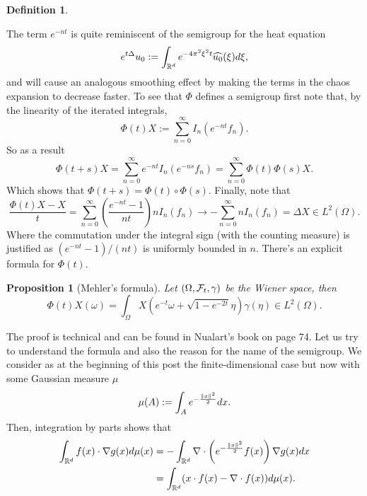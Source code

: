 \documentclass[12pt]{article}
\newtheorem{proposition}{Proposition}
\newtheorem{definition}{Definition}
\begin{document}
\begin{CJK*}{UTF8}{gbsn}
\begin{definition}
	\end{definition}
	The term $e^{-nt}$ is quite reminiscent of the semigroup for the heat equation
	\begin{equation*}
		e^{t\Delta }u_0:=\int_{{\mathbb R}^d}e^{-4 \pi^2 \xi^2t}\widehat{u_0}(\xi ) d\xi,
	\end{equation*}
	and will cause an analogous smoothing effect by making the terms in the chaos expansion to decrease	faster. To see that  $\Phi$ defines a semigroup first note that, by the linearity of the iterated integrals,
	\begin{equation*}
		\Phi(t)X:=\sum_{n=0}^{\infty}  I_n(e^{-nt}f_n).
	\end{equation*}
	So as a result
	\begin{equation*}
		\Phi(t+s)X=\sum_{n=0}^{\infty}  e^{-nt}I_n(e^{-ns}f_n)=\sum_{n=0}^{\infty}  \Phi(t)\Phi(s)X.
	\end{equation*}
	Which shows that $\Phi(t+s)=\Phi(t)\circ \Phi(s)$. Finally, note that
	\begin{equation*}
		\frac{\Phi(t)X-X}{t}=\sum_{n=0}^{\infty} \left(\frac{e^{-nt}-1}{nt} \right)nI_n(f_n)\to -\sum_{n=0}^{\infty}  nI_n(f_n)=\Delta X \in L^2(\Omega)  .
	\end{equation*}
	Where the commutation under the integral sign (with the counting measure) is justified as $(e^{-nt}-1)/(nt)$ is uniformly bounded in $n$.
	There's an explicit formula for $\Phi(t)$.
	\begin{proposition}[Mehler's formula]
		Let $(\Omega,\mathcal{F}_t,\gamma  )$ be the Wiener space, then
		\begin{equation*}
			\Phi(t)X(\omega)=\int_{\Omega}X\left(e^{-t}\omega+\sqrt{1-e^{-2t}}\eta\right) \gamma  (\eta)\in L^2(\Omega).
		\end{equation*}
	\end{proposition}
	The  proof is technical and can be found in  Nualart's book \cite{nualart2018introduction} on  page 74. Let us try to understand the formula and also the reason for the name of the semigroup. We consider as at the beginning of this post the finite-dimensional case but now with some Gaussian measure $\mu $
	\begin{equation*}
		\mu (A):=\int_{A}e^{-\frac{\norm{x}^2}{2} } dx.
	\end{equation*}
	Then, integration by parts shows that
	\begin{align*}
		\int_{\R^d}f(x) \cdot \nabla g(x) d\mu(x) & =-\int_{\R^d}\nabla\cdot  \left(e^{-\frac{\norm{x}^2}{2} }f(x)\right) \nabla g(x) dx \\&=\int_{\R^d}(x\cdot f(x)-\nabla\cdot f(x)) d\mu (x).

\end{align*}
\end{CJK*}
\end{document}
